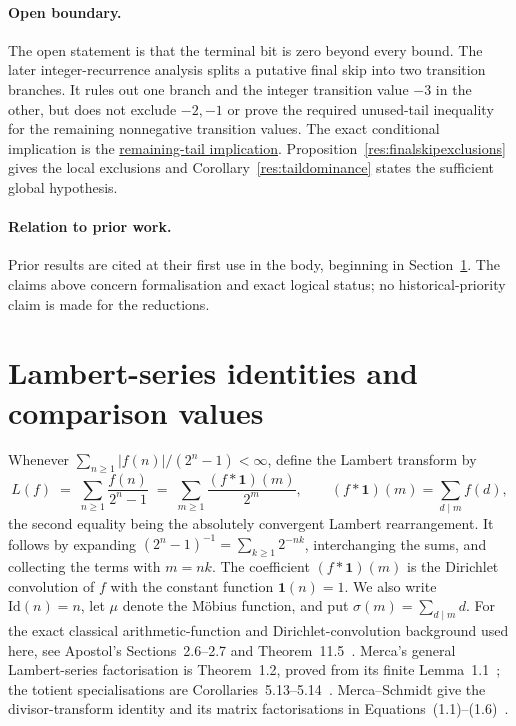 \documentclass[11pt]{article}
\newcommand{\commit}{99f4bf47422abbd8757cbb22b50ba079d764d3a7}
\newcommand{\repobase}{https://github.com/wcook04/plectis-erdos/blob/\commit}
\newcommand{\PK}{Erdos249257}
\newcommand{\lword}[4]{\href{\repobase/\PK/#1\#L#2}{#4}}
\theoremstyle{definition}
\theoremstyle{remark}
\begin{document}
\paragraph{Open boundary.}
The open statement is that the terminal bit is zero beyond every bound.  The
later integer-recurrence analysis splits a putative final skip into two
transition branches.  It rules out one branch and the integer transition value
\(-3\) in the other, but does not exclude \(-2,-1\) or prove the required
unused-tail inequality for the remaining nonnegative transition values.  The exact
conditional implication is the
\lword{HalfCylinderLastProducerContradiction.lean}{436}{half_mem_mersenneAchievementSet_of_middleProducerTailEscapeExceptNegThree}{remaining-tail implication}.
Proposition~\ref{res:finalskipexclusions} gives the local exclusions and
Corollary~\ref{res:taildominance} states the sufficient global hypothesis.

\paragraph{Relation to prior work.}
Prior results are cited at their first use in the body, beginning in
Section~\ref{sec:ladder}.  The claims above concern formalisation and exact
logical status; no historical-priority claim is made for the reductions.

\section{Lambert-series identities and comparison values}\label{sec:ladder}

Whenever \(\sum_{n\ge1}|f(n)|/(2^n-1)<\infty\), define the Lambert transform by
\[
L(f)\;=\;\sum_{n\ge1}\frac{f(n)}{2^n-1}\;=\;\sum_{m\ge1}\frac{(f*\mathbf 1)(m)}{2^m},
\qquad (f*\mathbf 1)(m)=\sum_{d\mid m} f(d),
\]
the second equality being the absolutely convergent Lambert rearrangement.
It follows by expanding \((2^n-1)^{-1}=\sum_{k\geq1}2^{-nk}\), interchanging
the sums, and collecting the terms with \(m=nk\).  The coefficient
\((f*\mathbf 1)(m)\) is the Dirichlet convolution of \(f\) with the constant
function \(\mathbf 1(n)=1\).  We also write \(\mathrm{Id}(n)=n\), let \(\mu\)
denote the M\"obius function, and put \(\sigma(m)=\sum_{d\mid m}d\).
For the exact classical arithmetic-function and Dirichlet-convolution
background used here, see Apostol's Sections~2.6--2.7 and
Theorem~11.5~\cite[pp.~28--32, 228--229]{apostol}.  Merca's general
Lambert-series factorisation is Theorem~1.2, proved from its finite
Lemma~1.1~\cite[pp.~420--421]{merca2017}; the totient specialisations are
Corollaries~5.13--5.14~\cite[pp.~430--431]{merca2017}.
Merca--Schmidt give the divisor-transform identity and its matrix
factorisations in Equations~(1.1)--(1.6)~\cite[pp.~31--34]{mercaschmidt}.
\end{document}
